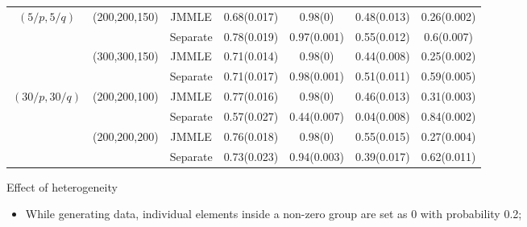 \documentclass[landscape,a0paper,fontscale=0.4]{baposter} %
\newcommand{\compresslist}{ %
\setlength{\itemsep}{1pt}
\setlength{\parskip}{0pt}
\setlength{\parsep}{0pt}
}
\begin{document}
\begin{poster}
{{\begin{tabular}{ccccccc}
    $(5/p, 5/q)$   & (200,200,150) & JMMLE    & 0.68(0.017) & 0.98(0)      & 0.48(0.013)  & 0.26(0.002) \\
    ~              & ~             & Separate & 0.78(0.019) & 0.97(0.001)  & 0.55(0.012)  & 0.6(0.007) \\\cline{2-7}
    ~              & (300,300,150) & JMMLE    & 0.71(0.014) & 0.98(0)      & 0.44(0.008)  & 0.25(0.002) \\
    ~              & ~             & Separate & 0.71(0.017) & 0.98(0.001)  & 0.51(0.011)  & 0.59(0.005) \\\hline
    $(30/p, 30/q)$ & (200,200,100) & JMMLE    & 0.77(0.016) & 0.98(0)      & 0.46(0.013)  & 0.31(0.003) \\
    ~              & ~             & Separate & 0.57(0.027) & 0.44(0.007)  & 0.04(0.008)  & 0.84(0.002)\\\hline
    ~              & (200,200,200) & JMMLE    & 0.76(0.018)  & 0.98(0)     & 0.55(0.015)  & 0.27(0.004) \\
    ~              & ~             & Separate & 0.73(0.023) & 0.94(0.003)  & 0.39(0.017)  & 0.62(0.011)\\\hline
\end{tabular}
}

{\large\colbbf Effect of heterogeneity}

\parbox{.39\textwidth}{
\begin{itemize}[leftmargin=*]\compresslist
\item While generating data, individual elements inside a non-zero group are set as 0 with probability 0.2;


\end{itemize}}}
\end{poster}
\end{document}
